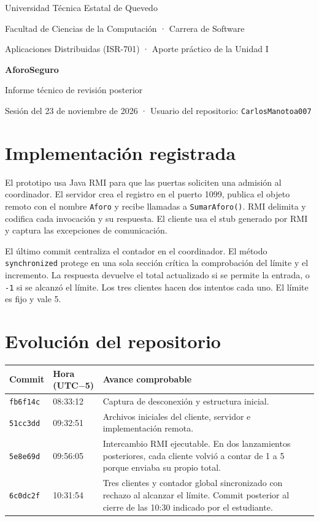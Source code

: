 \documentclass[11pt,a4paper]{article}
\begin{document}
{\small Universidad Técnica Estatal de Quevedo \par
Facultad de Ciencias de la Computación · Carrera de Software \par
Aplicaciones Distribuidas (ISR-701) · Aporte práctico de la Unidad I\par}
\vspace{0.65cm}
{\LARGE\bfseries AforoSeguro\par}
\vspace{0.15cm}
{\large Informe técnico de revisión posterior\par}
\vspace{0.2cm}
{\small Sesión del 23 de noviembre de 2026 · Usuario del repositorio: \texttt{CarlosManotoa007}\par}

\section*{Implementación registrada}
El prototipo usa Java RMI para que las puertas soliciten una admisión al coordinador. El servidor crea el registro en el puerto 1099, publica el objeto remoto con el nombre \texttt{Aforo} y recibe llamadas a \texttt{SumarAforo()}. RMI delimita y codifica cada invocación y su respuesta. El cliente usa el stub generado por RMI y captura las excepciones de comunicación.

El último commit centraliza el contador en el coordinador. El método \texttt{synchronized} protege en una sola sección crítica la comprobación del límite y el incremento. La respuesta devuelve el total actualizado si se permite la entrada, o \texttt{-1} si se alcanzó el límite. Los tres clientes hacen dos intentos cada uno. El límite es fijo y vale 5.

\section*{Evolución del repositorio}
\begingroup
\small
\renewcommand{\arraystretch}{1.23}
\begin{tabular}{@{}L{1.8cm}L{2.75cm}L{\dimexpr\linewidth-4.55cm-4\tabcolsep\relax}@{}}
\hline
\textbf{Commit} & \textbf{Hora (UTC$-$5)} & \textbf{Avance comprobable}\\
\hline
\texttt{fb6f14c} & 08:33:12 & Captura de desconexión y estructura inicial.\\
\texttt{51cc3dd} & 09:32:51 & Archivos iniciales del cliente, servidor e implementación remota.\\
\texttt{5e8e69d} & 09:56:05 & Intercambio RMI ejecutable. En dos lanzamientos posteriores, cada cliente volvió a contar de 1 a 5 porque enviaba su propio total.\\
\texttt{6c0dc2f} & 10:31:54 & Tres clientes y contador global sincronizado con rechazo al alcanzar el límite. Commit posterior al cierre de las 10:30 indicado por el estudiante.\\
\hline
\end{tabular}
\endgroup
\end{document}
